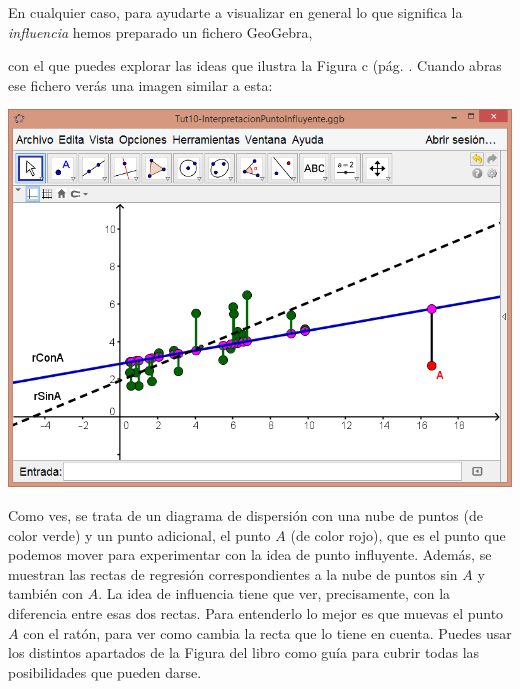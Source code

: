 \documentclass[10pt,a4paper]{article}\usepackage[]{graphicx}\usepackage[]{color}
\begin{document}
En cualquier caso, para ayudarte a visualizar en general lo que significa la {\em influencia} hemos preparado un fichero GeoGebra,
\begin{center}
\end{center}
con el que puedes explorar las ideas que ilustra la Figura c (pág. \pageref{curso-cap10:fig:ResiduosAtipicosPuntosInfluyentes}. Cuando abras ese fichero verás una imagen similar a esta:
\begin{center}
    \includegraphics[width=15cm]{../fig/Tut10-23.png}
\end{center}
Como ves, se trata de un diagrama de dispersión con una nube de puntos (de color verde) y un punto adicional, el punto $A$ (de color rojo), que es el punto que podemos mover para experimentar con la idea de punto influyente. Además, se muestran las rectas de regresión correspondientes a la nube de puntos sin $A$ y también con $A$. La idea de influencia tiene que ver, precisamente, con la diferencia entre esas dos rectas. Para entenderlo lo mejor es que muevas el punto $A$ con el ratón, para ver como cambia la recta que lo tiene en cuenta. Puedes usar los distintos apartados de la Figura \pageref{curso-cap10:fig:ResiduosAtipicosPuntosInfluyentes} del libro como guía para cubrir todas las posibilidades que pueden darse.
\end{document}
